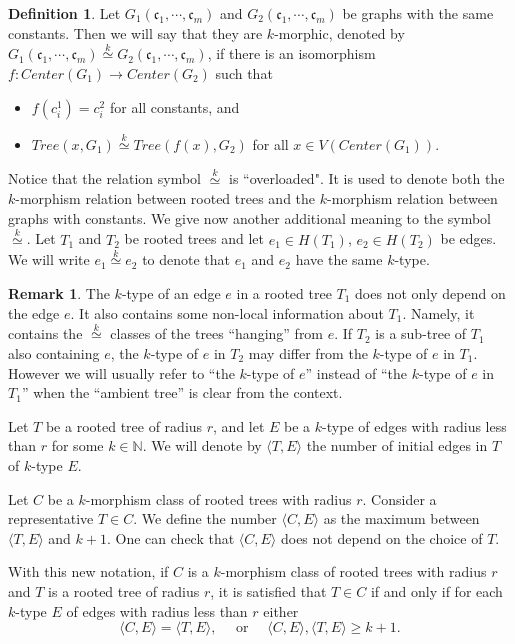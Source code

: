 \documentclass[11pt,notitlepage,a4paper]{article}
\theoremstyle{definition}
\newtheorem{definition}{Definition}[section]
\newtheorem{remark}{Remark}[section]
\newcommand{\N}{\mathbb{N}}
\newcommand{\clist}{\mathfrak{c}_{1}, \cdots, \mathfrak{c}_m}
\newcommand{\morph}[1]{\stackrel{#1}{\simeq}}
\begin{document}
\begin{definition} 
	Let $G_1(\clist)$ and $G_2(\clist)$ be graphs with the same constants. 
	Then we
	will say that they are $k$-morphic, denoted by $G_1(\clist)\morph{k}G_2(\clist)$, if there is an isomorphism
	$f:Center(G_1)\rightarrow Center(G_2)$ such that
	\begin{itemize}
		\item $f(c^1_i)=c^2_i$ for all constants, and
		\item $Tree(x,G_1)\morph{k} Tree(f(x),G_2)$ for all $x\in V(Center(G_1))$.
	\end{itemize}
\end{definition}


Notice that the relation symbol $\morph{k}$ is ``overloaded". 
It is used to denote
both the $k$-morphism relation between rooted 
trees and the $k$-morphism relation
between graphs with constants. We give now another additional
meaning to the symbol $\morph{k}$. 
Let $T_1$ and $T_2$ be rooted trees
and let $e_1\in H(T_1)$, $e_2\in H(T_2)$ be edges. We will 
write $e_1\morph{k} e_2$ to denote that $e_1$ and $e_2$ have
the same $k$-type.


\begin{remark}
	The $k$-type of an edge $e$ in a rooted tree $T_1$
	does not only depend on the edge $e$. It also contains some 
	non-local information about $T_1$. Namely, it contains the 
	$\morph{k}$ classes of the trees ``hanging'' from $e$.
	If $T_2$ is a sub-tree of $T_1$ also containing $e$, the $k$-type
	of $e$ in $T_2$ may differ from the $k$-type of $e$ in $T_1$.
	However we will usually refer to ``the $k$-type of $e$'' instead of
	``the $k$-type of $e$ in $T_1$'' when the ``ambient tree'' is clear
	from the context.   
\end{remark}

Let $T$ be a rooted tree of radius $r$, and let $E$ be a $k$-type 
of edges with radius less than $r$ for some $k\in \N$. We will denote by $\langle T,E \rangle$
the number of initial edges in $T$ of $k$-type $E$. \par
Let $C$ be a $k$-morphism class of rooted trees with radius $r$. 
Consider
a representative $T\in C$. We define the number $\langle C, E \rangle$ 
as the maximum between $\langle T, E\rangle$ and $k+1$. One can check that 
$\langle C, E\rangle$ does not depend on the choice of $T$.\par

With this new notation, if $C$ is a $k$-morphism class of rooted
trees with radius $r$ and $T$ is a rooted tree of radius $r$, it
is satisfied that $T\in C$ if and only if for each $k$-type $E$ of edges 
with radius less than $r$ either
\[ \langle C,E \rangle=\langle T,E \rangle, \quad \text{ or } \quad
\langle C,E \rangle,
\langle T,E \rangle \geq k+1 .\]
 
\end{document}
